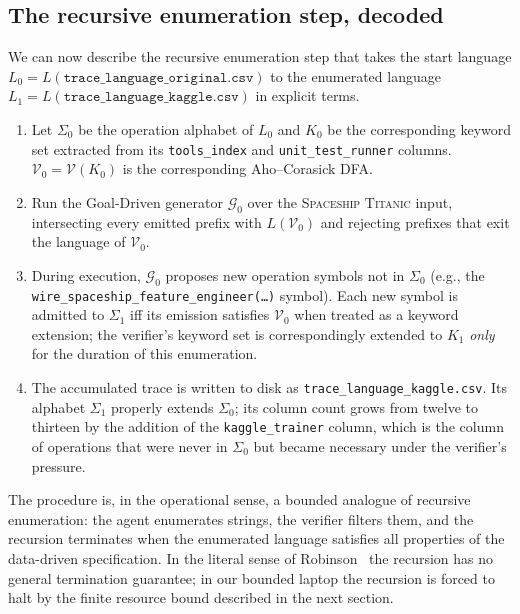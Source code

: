 \subsection{The recursive enumeration step, decoded}

We can now describe the recursive enumeration step that takes
the start language $L_0 =
L(\texttt{trace\_language\_original.csv})$ to the enumerated
language $L_1 = L(\texttt{trace\_language\_kaggle.csv})$ in
explicit terms.

\begin{enumerate}
\item Let $\Sigma_0$ be the operation alphabet of $L_0$ and
$K_0$ be the corresponding keyword set extracted from its
\texttt{tools\_index} and \texttt{unit\_test\_runner} columns.
$\mathcal{V}_0 = \mathcal{V}(K_0)$ is the corresponding
Aho--Corasick DFA.
\item Run the Goal-Driven generator $\mathcal{G}_0$ over the
\textsc{Spaceship Titanic} input, intersecting every emitted
prefix with $L(\mathcal{V}_0)$ and rejecting prefixes that
exit the language of $\mathcal{V}_0$.
\item During execution, $\mathcal{G}_0$ proposes new operation
symbols not in $\Sigma_0$ (e.g., the
\texttt{wire\_spaceship\_feature\_engineer(\dots)} symbol). Each
new symbol is admitted to $\Sigma_1$ iff its emission satisfies
$\mathcal{V}_0$ when treated as a keyword extension; the
verifier's keyword set is correspondingly extended to $K_1$
\emph{only} for the duration of this enumeration.
\item The accumulated trace is written to disk as
\texttt{trace\_language\_kaggle.csv}.  Its alphabet $\Sigma_1$
properly extends $\Sigma_0$; its column count grows from twelve to
thirteen by the addition of the \texttt{kaggle\_trainer} column,
which is the column of operations that were never in
$\Sigma_0$ but became necessary under the verifier's pressure.
\end{enumerate}

The procedure is, in the operational sense, a bounded analogue of recursive
enumeration: the agent enumerates strings, the verifier filters
them, and the recursion terminates when the enumerated language
satisfies all properties of the data-driven specification.  In
the literal sense of
Robinson~\cite{robinson1949definability,davis1961decision} the
recursion has no general termination guarantee; in our bounded
laptop the recursion is forced to halt by the finite resource bound
described in the next section.
